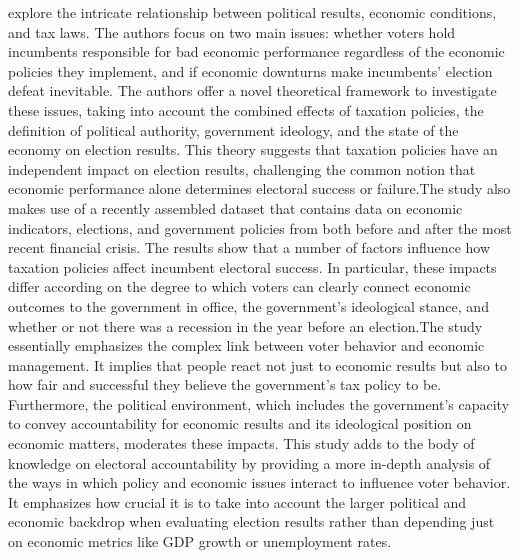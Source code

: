  explore the intricate relationship between political results, economic conditions, and tax laws. The authors focus on two main issues: whether voters hold incumbents responsible for bad economic performance regardless of the economic policies they implement, and if economic downturns make incumbents' election defeat inevitable. The authors offer a novel theoretical framework to investigate these issues, taking into account the combined effects of taxation policies, the definition of political authority, government ideology, and the state of the economy on election results. This theory suggests that taxation policies have an independent impact on election results, challenging the common notion that economic performance alone determines electoral success or failure.The study also makes use of a recently assembled dataset that contains data on economic indicators, elections, and government policies from both before and after the most recent financial crisis. The results show that a number of factors influence how taxation policies affect incumbent electoral success. In particular, these impacts differ according on the degree to which voters can clearly connect economic outcomes to the government in office, the government's ideological stance, and whether or not there was a recession in the year before an election.The study essentially emphasizes the complex link between voter behavior and economic management. It implies that people react not just to economic results but also to how fair and successful they believe the government's tax policy to be. Furthermore, the political environment, which includes the government's capacity to convey accountability for economic results and its ideological position on economic matters, moderates these impacts. This study adds to the body of knowledge on electoral accountability by providing a more in-depth analysis of the ways in which policy and economic issues interact to influence voter behavior. It emphasizes how crucial it is to take into account the larger political and economic backdrop when evaluating election results rather than depending just on economic metrics like GDP growth or unemployment rates.\par
